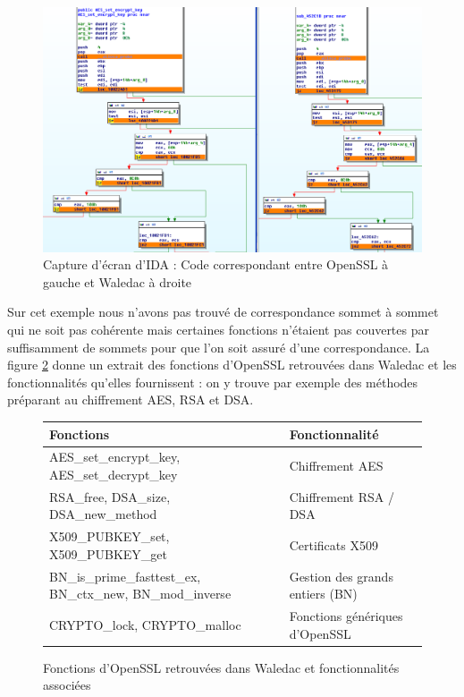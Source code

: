\begin{figure}[h]
\begin{center}
\includegraphics[width=1.0\textwidth]{supports/libs/WalSSLIDAAESgraph.png}
\caption{Capture d'écran d'IDA : Code correspondant entre OpenSSL à gauche et Waledac à droite} 
\label{fig:plugin_code_sync}
\end{center}
\end{figure}

Sur cet exemple nous n'avons pas trouvé de correspondance sommet à sommet qui ne soit pas cohérente mais certaines fonctions n'étaient pas couvertes par suffisamment de sommets pour que l'on soit assuré d'une correspondance.
La figure \ref{fig:tab_fonctionnalites_waledac_openssl} donne un extrait des fonctions d'OpenSSL retrouvées dans Waledac et les fonctionnalités qu'elles fournissent : on y trouve par exemple des méthodes préparant au chiffrement AES, RSA et DSA.

\begin{figure}[h]
\begin{tabular}{|p{9cm}|l|}
\hline
Fonctions 							& Fonctionnalité 			\\
\hline
AES\_set\_encrypt\_key, AES\_set\_decrypt\_key 			& Chiffrement AES 			\\
RSA\_free, DSA\_size, DSA\_new\_method 				& Chiffrement RSA / DSA 		\\
 X509\_PUBKEY\_set, X509\_PUBKEY\_get 				& Certificats X509 			\\
BN\_is\_prime\_fasttest\_ex, BN\_ctx\_new, BN\_mod\_inverse	& Gestion des grands entiers (BN)	\\
CRYPTO\_lock, CRYPTO\_malloc 					& Fonctions génériques d'OpenSSL 	\\
\hline
\end{tabular}
\caption{Fonctions d'OpenSSL retrouvées dans Waledac et fonctionnalités associées}
\label{fig:tab_fonctionnalites_waledac_openssl}
\end{figure}

